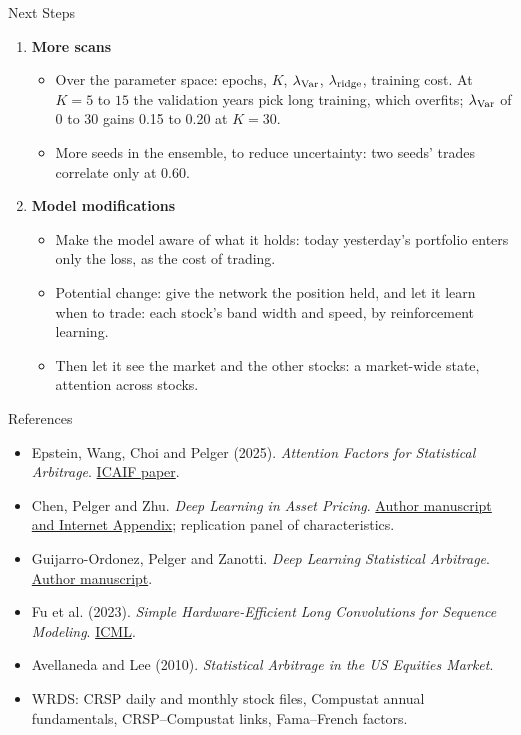 \documentclass[11pt]{beamer}
\begin{document}
\begin{frame}{Next Steps}
\begin{enumerate}
\item \textbf{More scans}
\begin{itemize}
\item Over the parameter space: epochs, $K$, $\lambda_{\rm Var}$, $\lambda_{\rm ridge}$, training cost.
      At $K=5$ to $15$ the validation years pick long training, which overfits;
      $\lambda_{\rm Var}$ of 0 to 30 gains 0.15 to 0.20 at $K=30$.
\item More seeds in the ensemble, to reduce uncertainty: two seeds' trades correlate only at 0.60.
\end{itemize}
\medskip
\item \textbf{Model modifications}
\begin{itemize}
\item Make the model aware of what it holds: today yesterday's portfolio enters only the loss, as the cost of trading.
\item Potential change: give the network the position held, and let it learn when to trade:
      each stock's band width and speed, by reinforcement learning.
\item Then let it see the market and the other stocks: a market-wide state, attention across stocks.
\end{itemize}
\end{enumerate}
\end{frame}

\begin{frame}{References}
\scriptsize
\begin{itemize}
\item Epstein, Wang, Choi and Pelger (2025). \emph{Attention Factors for Statistical Arbitrage}. \href{https://doi.org/10.1145/3768292.3770398}{ICAIF paper}.
\item Chen, Pelger and Zhu. \emph{Deep Learning in Asset Pricing}. \href{https://arxiv.org/abs/1904.00745}{Author manuscript and Internet Appendix}; replication panel of characteristics.
\item Guijarro-Ordonez, Pelger and Zanotti. \emph{Deep Learning Statistical Arbitrage}. \href{https://arxiv.org/abs/2106.04028}{Author manuscript}.
\item Fu et al. (2023). \emph{Simple Hardware-Efficient Long Convolutions for Sequence Modeling}. \href{https://proceedings.mlr.press/v202/fu23a.html}{ICML}.
\item Avellaneda and Lee (2010). \emph{Statistical Arbitrage in the US Equities Market}.
\item WRDS: CRSP daily and monthly stock files, Compustat annual fundamentals, CRSP--Compustat links, Fama--French factors.
\end{itemize}
\end{frame}
\end{document}
